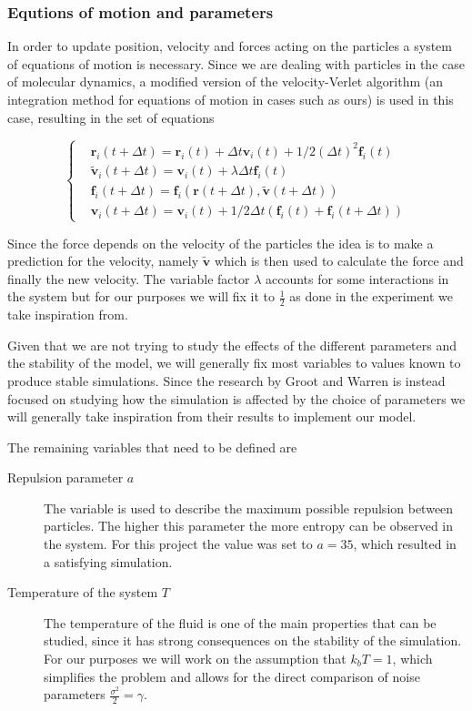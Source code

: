 \documentclass[]{usiinfbachelorproject}
\begin{document}
\subsubsection{Equtions of motion and parameters}
In order to update position, velocity and forces acting on the particles a system of equations of motion is 
necessary. Since we are dealing with particles in the case of molecular dynamics, a modified version of the 
velocity-Verlet algorithm (an integration method for equations of motion in cases such as ours) is used in this case, 
resulting in the set of equations 

\begin{equation*}
    \left\{
        \begin{aligned}
          & \textbf{r}_i (t + \Delta t) = \textbf{r}_i (t) + \Delta t \textbf{v}_i (t) + 1/2(\Delta t)^2 \textbf{f}_i(t)\\
          & \tilde{\textbf{v}}_i (t + \Delta t) = \textbf{v}_i (t) + \lambda  \Delta t \textbf{f}_i(t)\\
          & \textbf{f}_i(t + \Delta t) = \textbf{f}_i(\textbf{r} (t + \Delta t), \tilde{\textbf{v}} (t + \Delta t))\\
          & \textbf{v}_i (t + \Delta t) = \textbf{v}_i (t) + 1/2 \Delta t (\textbf{f}_i(t) + \textbf{f}_i(t + \Delta t))
        \end{aligned}
      \right.
\end{equation*}

Since the force depends on the velocity of the particles the idea is to make a prediction for the velocity, namely 
$\tilde{\textbf{v}}$ which is then used to calculate the force and finally the new velocity. The variable factor 
$\lambda$ accounts for some interactions in the system but for our purposes we will fix it to $\frac{1}{2}$ as 
done in the experiment we take inspiration from. 

Given that we are not trying to study the effects of the different parameters and the stability of the model, we 
will generally fix most variables to values known to produce stable simulations. Since the research by Groot and Warren is 
instead focused on studying how the simulation is affected by the choice of parameters we will generally take inspiration 
from their results to implement our model.

The remaining variables that need to be defined are 

\begin{description}
  \item[Repulsion parameter $a$] The variable is used to describe the maximum possible repulsion between particles. 
  The higher this parameter the more entropy can be observed in the system. For this project the value was set to 
  $a = 35$, which resulted in a satisfying simulation.
  \item[Temperature of the system $T$] The temperature of the fluid is one of the main properties that can be studied, 
  since it has strong consequences on the stability of the simulation. For our purposes we will work on the assumption that 
  $k_b T = 1$, which simplifies the problem and allows for the direct comparison of noise parameters $\frac{\sigma^2}{2} = \gamma$.
\end{description}
\end{document}
